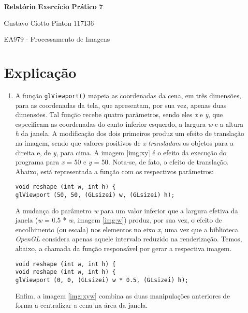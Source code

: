 \documentclass[12pt, a4paper]{article}
\begin{document}
{\large
\centerline{\textbf{Relatório Exercício Prático 7}}
\centerline{Gustavo Ciotto Pinton 117136}
\centerline{EA979 - Processamento de Imagens}
}

\section* {Explicação}

\begin {enumerate}
  \item A função \texttt{glViewport()} mapeia as coordenadas da cena, em três
  dimensões, para as coordenadas da tela, que apresentam, por sua vez, apenas
  duas dimensões. Tal função recebe quatro parâmetros, sendo eles \textit{x} e
  \textit{y}, que especificam as coordenadas do canto inferior esquerdo, a
  largura \textit{w} e a altura \textit{h} da janela. A modificação dos dois
  primeiros produz um efeito de translação na imagem, sendo que valores
  positivos de \textit{x} \textit{transladam} os objetos para a direita e, de
  \textit{y}, para cima. A imagem \ref{img:xy} é o efeito da execução do
  programa para \textit{x} = 50 e \textit{y} = 50. Nota-se, de fato, o efeito de
  translação. Abaixo, está representada a função com os respectivos parâmetros:
  
  
  \begin{lstlisting}[keywordstyle=\ttfamily, style=nonumbers]
void reshape (int w, int h) {
glViewport (50, 50, (GLsizei) w, (GLsizei) h);
\end{lstlisting}

A mudança do parâmetro \textit{w} para um valor inferior que a largura efetiva
da janela (\textit{w} = 0.5 * \textit{w}, imagem \ref{img:w}) produz, por sua
vez, o efeito de encolhimento (ou escala) nos elementos no eixo \textit{x},
uma vez que a biblioteca \textit{OpenGL} considera apenas aquele intervalo
reduzido na renderização.
Temos, abaixo, a chamada da função responsável por gerar a respectiva imagem.

\begin{lstlisting}[keywordstyle=\ttfamily, style=nonumbers] void reshape (int w, int h) {
void reshape (int w, int h) {
glViewport (0, 0, (GLsizei) w * 0.5, (GLsizei) h);
\end{lstlisting}

Enfim, a imagem \ref{img:xyw} combina as duas manipulações anteriores de forma
a centralizar a cena na área da janela.


\end{enumerate}
\end{document}
